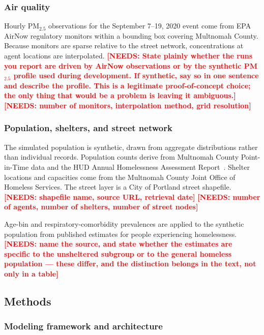 \documentclass[graybox]{svmult}
\newcommand{\NEEDS}[1]{\textcolor{red}{\textbf{[NEEDS: #1]}}}
\begin{document}
\subsubsection{Air quality}

Hourly PM$_{2.5}$ observations for the September 7--19, 2020 event come from EPA
AirNow regulatory monitors within a bounding box covering Multnomah County.
Because monitors are sparse relative to the street network, concentrations at
agent locations are interpolated.
\NEEDS{State plainly whether the runs you report are driven by AirNow
observations or by the synthetic PM$_{2.5}$ profile used during development. If
synthetic, say so in one sentence and describe the profile. This is a legitimate
proof-of-concept choice; the only thing that would be a problem is leaving it
ambiguous.}
\NEEDS{number of monitors, interpolation method, grid resolution}

\subsubsection{Population, shelters, and street network}

The simulated population is synthetic, drawn from aggregate distributions rather
than individual records. Population counts derive from Multnomah County
Point-in-Time data and the HUD Annual Homelessness Assessment
Report~\cite{henry2023}. Shelter locations and capacities come from the
Multnomah County Joint Office of Homeless Services. The street layer is a City of
Portland street shapefile.
\NEEDS{shapefile name, source URL, retrieval date}
\NEEDS{number of agents, number of shelters, number of street nodes}

Age-bin and respiratory-comorbidity prevalences are applied to the synthetic
population from published estimates for people experiencing homelessness.
\NEEDS{name the source, and state whether the estimates are specific to the
unsheltered subgroup or to the general homeless population --- these differ, and
the distinction belongs in the text, not only in a table}

\subsection{Methods}
\label{subsec:5}

\subsubsection{Modeling framework and architecture}
\end{document}
